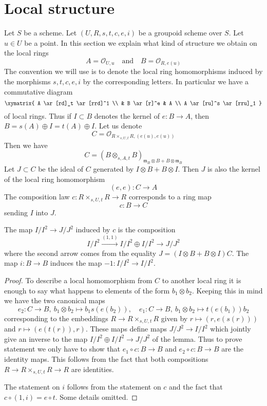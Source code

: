 \section{Local structure}
\label{section-local}

\noindent
Let $S$ be a scheme.
Let $(U, R, s, t, c, e, i)$ be a groupoid scheme over $S$.
Let $u \in U$ be a point. In this section we explain what
kind of structure we obtain on the local rings
$$
A = \mathcal{O}_{U, u}
\quad\text{and}\quad
B = \mathcal{O}_{R, e(u)}
$$
The convention we will use is to denote the local ring homomorphisms
induced by the morphisms $s, t, c, e, i$ by the corresponding letters.
In particular we have a commutative diagram
$$
\xymatrix{
A \ar[rd]_t \ar[rrd]^1 \\
& B \ar[r]^e & A \\
A \ar[ru]^s \ar[rru]_1
}
$$
of local rings. Thus if $I \subset B$ denotes the kernel of $e : B \to A$,
then $B = s(A) \oplus I = t(A) \oplus I$. Let us denote
$$
C = \mathcal{O}_{R \times_{s, U, t} R, (e(u), e(u))}
$$
Then we have
$$
C = (B \otimes_{s, A, t} B)_{\mathfrak m_B \otimes B + B \otimes \mathfrak m_B}
$$
Let $J \subset C$ be the ideal of $C$ generated by $I \otimes B + B \otimes I$.
Then $J$ is also the kernel of the local ring homomorphism
$$
(e, e) : C \longrightarrow A
$$
The composition law $c : R \times_{s, U, t} R \to R$ corresponds to a
ring map
$$
c : B \longrightarrow C
$$
sending $I$ into $J$.

\begin{lemma}
\label{lemma-first-order-structure-c}
The map $I/I^2 \to J/J^2$ induced by $c$ is the composition
$$
I/I^2 \xrightarrow{(1, 1)} I/I^2 \oplus I/I^2 \to J/J^2
$$
where the second arrow comes from the equality
$J = (I \otimes B + B \otimes I)C$.
The map $i : B \to B$ induces the map $-1 : I/I^2 \to I/I^2$.
\end{lemma}

\begin{proof}
To describe a local homomorphism from $C$ to another local ring
it is enough to say what happens to elements of the form
$b_1 \otimes b_2$. Keeping this in mind we have the two canonical maps
$$
e_2 : C \to B,\ b_1 \otimes b_2 \mapsto b_1s(e(b_2)),\quad
e_1 : C \to B,\ b_1 \otimes b_2 \mapsto t(e(b_1))b_2
$$
corresponding to the embeddings
$R \to R \times_{s, U, t} R$ given by
$r \mapsto (r, e(s(r)))$ and $r \mapsto (e(t(r)), r)$.
These maps define maps $J/J^2 \to I/I^2$ which jointly
give an inverse to the map $I/I^2 \oplus I/I^2 \to J/J^2$
of the lemma. Thus to prove statement we only have to show
that $e_1 \circ c : B \to B$ and $e_2 \circ c : B \to B$
are the identity maps. This follows from the fact that both
compositions $R \to R \times_{s, U, t} R \to R$ are identities.

\medskip\noindent
The statement on $i$ follows from the statement on $c$ and the
fact that $c \circ (1, i) = e \circ t$. Some details omitted.
\end{proof}






